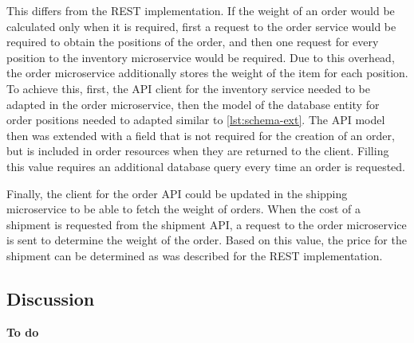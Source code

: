 This differs from the \ac{REST} implementation.
If the weight of an order would be calculated only when it is required, first a request to the order service would be required to obtain the positions of the order, and then one request for every position to the inventory microservice would be required.
Due to this overhead, the order microservice additionally stores the weight of the item for each position.
To achieve this, first, the \ac{API} client for the inventory service needed to be adapted in the order microservice, then the model of the database entity for order positions needed to adapted similar to \autoref{lst:schema-ext}.
The \ac{API} model then was extended with a field that is not required for the creation of an order, but is included in order resources when they are returned to the client.
Filling this value requires an additional database query every time an order is requested.

Finally, the client for the order \ac{API} could be updated in the shipping microservice to be able to fetch the weight of orders.
When the cost of a shipment is requested from the shipment \ac{API}, a request to the order microservice is sent to determine the weight of the order.
Based on this value, the price for the shipment can be determined as was described for the \ac{REST} implementation.

\subsection{Discussion}

\textbf{To do}